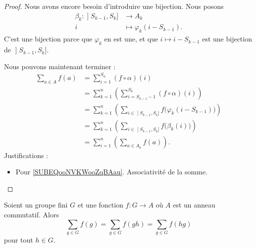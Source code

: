 \begin{proof}
    Nous avons encore besoin d'introduire une bijection. Nous posons
    \begin{equation}
        \begin{aligned}
        \beta_k\colon \mathopen] S_{k-1} , S_k \mathclose]&\to A_k \\
        i&\mapsto \varphi_k(i-S_{k-1}). 
        \end{aligned}
    \end{equation}
    C'est une bijection parce que \( \varphi_k\) en est une, et que \( i\mapsto i-S_{k-1}\) est une bijection de \( \mathopen] S_{k-1} , S_k \mathclose]\).

    Nous pouvons maintenant terminer :
    \begin{subequations}
        \begin{align}
            \sum_{a\in A}f(a)&=\sum_{i=1}^{S_n}(f\circ \alpha)(i)\\
            &=\sum_{k=1}^n\left( \sum_{i=S_{k-1}-1}^{S_k}(f\circ \alpha)(i) \right)        \label{SUBEQooNVKWooZqBAau}\\
        &=\sum_{k=1}^n\left( \sum_{i\in \mathopen] S_{k-1} , S_k \mathclose]}f\big( \varphi_k(i-S_{k-1}) \big)  \right)\\
    &=\sum_{k=1}^n\left( \sum_{i\in \mathopen] S_{k-1} , S_k \mathclose]}f\big( \beta_k(i) \big) \right)\\
    &=\sum_{i=1}^n\left( \sum_{a\in A_k}f(a) \right).
        \end{align}
    \end{subequations}
    Justifications :
    \begin{itemize}
        \item Pour \eqref{SUBEQooNVKWooZqBAau}. Associativité de la somme.
    \end{itemize}
\end{proof}


\begin{proposition}     \label{PROPooWJQQooFINSEc}
    Soient un groupe fini \( G\) et une fonction \( f\colon G\to A\) où \( A\) est un anneau commutatif. Alors
    \begin{equation}
        \sum_{g\in G}f(g)=\sum_{g\in G}f(gh)=\sum_{g\in G}f(hg)
    \end{equation}
    pour tout \( h\in G\).
\end{proposition}

